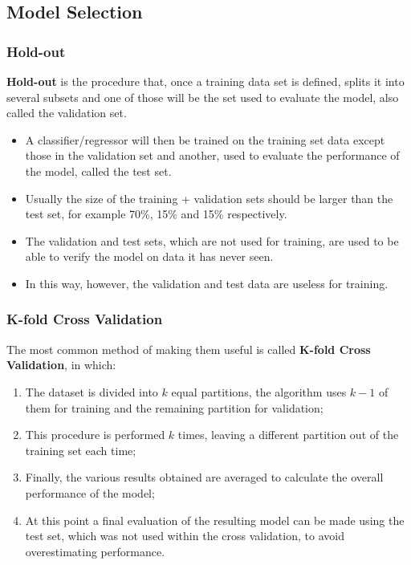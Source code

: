 \subsection{Model Selection}

\subsubsection{Hold-out}
\textbf{Hold-out} is the procedure that, once a training data set is defined, splits it into several subsets and one of those will be the set used to evaluate the model, also called the validation set.
\begin{itemize}
    \item A classifier/regressor will then be trained on the training set data except those in the validation set and another, used to evaluate the performance of the model, called the test set.
    \item Usually the size of the training + validation sets should be larger than the test set, for example 70\%, 15\% and 15\% respectively.
    \item The validation and test sets, which are not used for training, are used to be able to verify the model on data it has never seen.
    \item In this way, however, the validation and test data are useless for training.
\end{itemize}
\newpage
\subsubsection{K-fold Cross Validation}
The most common method of making them useful is called \textbf{K-fold Cross Validation}, in which:
\begin{enumerate}
    \item The dataset is divided into $k$ equal partitions, the algorithm uses $k-1$ of them for training and the remaining partition for validation;
    \item This procedure is performed $k$ times, leaving a different partition out of the training set each time;
    \item Finally, the various results obtained are averaged to calculate the overall performance of the model;
    \item At this point a final evaluation of the resulting model can be made using the test set, which was not used within the cross validation, to avoid overestimating performance.
\end{enumerate}       


